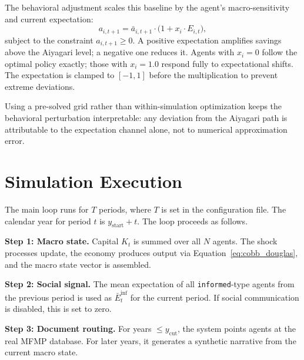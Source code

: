 The behavioral adjustment scales this baseline by the agent's macro-sensitivity and current expectation:
\begin{equation}
    a_{i,t+1} = \bar{a}_{i,t+1} \cdot \bigl(1 + x_i \cdot E_{i,t}\bigr),
    \label{eq:behavioral_adjustment}
\end{equation}
subject to the constraint $a_{i,t+1} \geq 0$. A positive expectation amplifies savings above the Aiyagari level; a negative one reduces it. Agents with $x_i = 0$ follow the optimal policy exactly; those with $x_i = 1.0$ respond fully to expectational shifts. The expectation is clamped to $[-1, 1]$ before the multiplication to prevent extreme deviations.

Using a pre-solved grid rather than within-simulation optimization keeps the behavioral perturbation interpretable: any deviation from the Aiyagari path is attributable to the expectation channel alone, not to numerical approximation error.

\section{Simulation Execution}
\label{sec:simulation}

The main loop runs for $T$ periods, where $T$ is set in the configuration file. The calendar year for period $t$ is $y_{\text{start}} + t$. The loop proceeds as follows.

\textbf{Step 1: Macro state.} Capital $K_t$ is summed over all $N$ agents. The shock processes update, the economy produces output via Equation~\eqref{eq:cobb_douglas}, and the macro state vector is assembled.

\textbf{Step 2: Social signal.} The mean expectation of all \texttt{informed}-type agents from the previous period is used as $\bar{E}^{\text{inf}}_t$ for the current period. If social communication is disabled, this is set to zero.

\textbf{Step 3: Document routing.} For years $\leq y_{\text{cut}}$, the system points agents at the real MFMP database. For later years, it generates a synthetic narrative from the current macro state.

